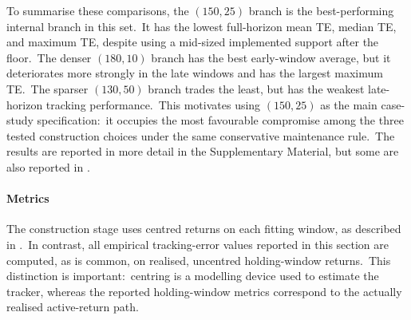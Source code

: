 \documentclass[11pt]{article}
\begin{document}
To summarise these comparisons, the \((150,25)\) branch is the best-performing internal branch in this set.\ It has the lowest full-horizon mean TE, median TE, and maximum TE, despite using a mid-sized implemented support after the floor.\ The denser \((180,10)\) branch has the best early-window average, but it deteriorates more strongly in the late windows and has the largest maximum TE.\ The sparser \((130,50)\) branch trades the least, but has the weakest late-horizon tracking performance.\ This motivates using \((150,25)\) as the main case-study specification:\ it occupies the most favourable compromise among the three tested construction choices under the same conservative maintenance rule.\ The results are reported in more detail in the Supplementary Material, but some are also reported in . 


\paragraph{Metrics}

The construction stage uses centred returns on each fitting window, as described in .\ In contrast, all empirical tracking-error values reported in this section are computed, as is common, on realised, uncentred holding-window returns.\ This distinction is important:\ centring is a modelling device used to estimate the tracker, whereas the reported holding-window metrics correspond to the actually realised active-return path.
\end{document}
